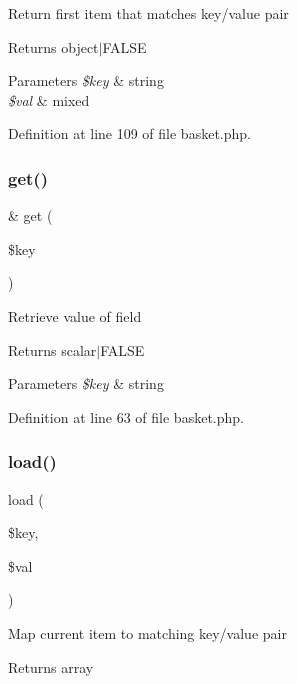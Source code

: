 Return first item that matches key/value pair \begin{DoxyReturn}{Returns}
object$\vert$\+F\+A\+L\+SE 
\end{DoxyReturn}

\begin{DoxyParams}{Parameters}
{\em \$key} & string \\
\hline
{\em \$val} & mixed \\
\hline
\end{DoxyParams}


Definition at line 109 of file basket.\+php.

\hypertarget{class_basket_ac3695923790b06917410e205068b8376}{}\label{class_basket_ac3695923790b06917410e205068b8376} 
\subsubsection{\texorpdfstring{get()}{get()}}
{\footnotesize\ttfamily \& get (\begin{DoxyParamCaption}\item[{}]{\$key }\end{DoxyParamCaption})}

Retrieve value of field \begin{DoxyReturn}{Returns}
scalar$\vert$\+F\+A\+L\+SE 
\end{DoxyReturn}

\begin{DoxyParams}{Parameters}
{\em \$key} & string \\
\hline
\end{DoxyParams}


Definition at line 63 of file basket.\+php.

\hypertarget{class_basket_abc7666f1c00ea27802ea7f19bdec2d17}{}\label{class_basket_abc7666f1c00ea27802ea7f19bdec2d17} 
\subsubsection{\texorpdfstring{load()}{load()}}
{\footnotesize\ttfamily load (\begin{DoxyParamCaption}\item[{}]{\$key,  }\item[{}]{\$val }\end{DoxyParamCaption})}

Map current item to matching key/value pair \begin{DoxyReturn}{Returns}
array 
\end{DoxyReturn}

